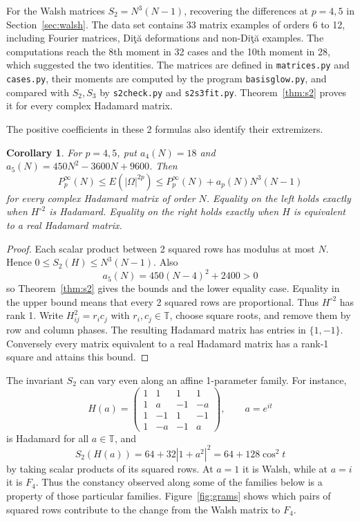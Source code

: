 \documentclass[11pt,a4paper]{article}
\newtheorem{cor}[thm]{Corollary}
\theoremstyle{remark}
\begin{document}
For the Walsh matrices $S_2=N^3(N-1)$, recovering the differences at $p=4,5$ in Section~\ref{sec:walsh}. The data set contains 33 matrix examples of orders 6 to 12, including Fourier matrices, Di\c t\u a deformations and non-Di\c t\u a examples. The computations reach the 8th moment in 32 cases and the 10th moment in 28, which suggested the two identities. The matrices are defined in \texttt{matrices.py} and \texttt{cases.py}, their moments are computed by the program \texttt{basisglow.py}, and compared with $S_2,S_3$ by \texttt{s2check.py} and \texttt{s2s3fit.py}. Theorem~\ref{thm:s2} proves it for every complex Hadamard matrix.

The positive coefficients in these 2 formulas also identify their extremizers.

\begin{samepage}
\begin{cor}\label{cor:extreme}
For $p=4,5$, put $a_4(N)=18$ and $a_5(N)=450N^2-3600N+9600$. Then
\[
 P^\infty_p(N)\le E(|\Omega|^{2p})
       \le P^\infty_p(N)+a_p(N)N^3(N-1)
\]
for every complex Hadamard matrix of order $N$. Equality on the left holds exactly when $H^{\circ2}$ is Hadamard. Equality on the right holds exactly when $H$ is equivalent to a real Hadamard matrix.
\end{cor}
\end{samepage}
\begin{proof}
Each scalar product between 2 squared rows has modulus at most $N$. Hence $0\le S_2(H)\le N^3(N-1)$. Also
\[
 a_5(N)=450(N-4)^2+2400>0
\]
so Theorem~\ref{thm:s2} gives the bounds and the lower equality case. Equality in the upper bound means that every 2 squared rows are proportional. Thus $H^{\circ2}$ has rank 1. Write $H_{ij}^2=r_ic_j$ with $r_i,c_j\in\mathbb T$, choose square roots, and remove them by row and column phases. The resulting Hadamard matrix has entries in $\{1,-1\}$. Conversely every matrix equivalent to a real Hadamard matrix has a rank-1 square and attains this bound.
\end{proof}

The invariant $S_2$ can vary even along an affine 1-parameter family. For instance,
\[
 H(a)=
 \begin{pmatrix}
 1&1&1&1\\
 1&a&-1&-a\\
 1&-1&1&-1\\
 1&-a&-1&a
 \end{pmatrix},\qquad a=e^{it}
\]
is Hadamard for all $a\in\mathbb T$, and
\[
 S_2(H(a))=64+32|1+a^2|^2=64+128\cos^2t
\]
by taking scalar products of its squared rows. At $a=1$ it is Walsh, while at $a=i$ it is $F_4$. Thus the constancy observed along some of the families below is a property of those particular families.
Figure~\ref{fig:grams} shows which pairs of squared rows contribute to
the change from the Walsh matrix to $F_4$.
\end{document}

